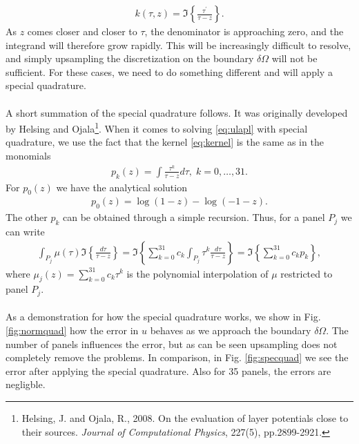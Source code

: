 \documentclass[a4paper,10pt]{article}
\begin{document}
\begin{align}
k(\tau,z) = \Im\left\{ \frac{\tau^\prime}{\tau-z}\right\}.
\label{eq:kernel}
\end{align}
As $z$ comes closer and closer to $\tau$, the denominator is approaching zero, and the integrand will therefore grow rapidly. This will be increasingly difficult to resolve, and simply upsampling the discretization on the boundary $\delta\Omega$ will not be sufficient. For these cases, we need to do something different and will apply a special quadrature.
\\ \\
A short summation of the special quadrature follows. It was originally developed by Helsing and Ojala\footnote{Helsing, J. and Ojala, R., 2008. On the evaluation of layer potentials close to their sources. {\em Journal of Computational Physics}, 227(5), pp.2899-2921.}. When it comes to solving \eqref{eq:ulapl} with special quadrature, we use the fact that the kernel \eqref{eq:kernel} is the same as in the monomials 
\begin{align}
    p_k(z) = \int \frac{\tau^k}{\tau-z}d\tau, \; k=0,\hdots,31.
    \label{eq:pkrec}
\end{align}
For $p_0(z)$ we have the analytical solution 
\begin{align}
    p_0(z) = \log(1-z)-\log(-1-z).
    \label{eq:p0}  
\end{align}
The other $p_k$ can be obtained through a simple recursion. Thus, for a panel $P_j$ we can write
\begin{align}
    \int_{P_j} \mu(\tau) \Im\left\{ \frac{d\tau}{\tau-z} \right\} = \Im\left\{ \sum_{k=0}^{31} c_k \int_{P_j} \tau^k\frac{d\tau}{\tau-z} \right\} = \Im\left\{ \sum_{k=0}^{31} c_kp_k \right\},
    \label{eq:specQ}
\end{align}
where $\mu_j(z) = \sum_{k=0}^{31} c_k\tau^k$ is the polynomial interpolation of $\mu$ restricted to panel $P_j$. 
\\ \\
As a demonstration for how the special quadrature works, we show in Fig. \ref{fig:normquad} how the error in $u$ behaves as we approach the boundary $\delta\Omega$. The number of panels influences the error, but as can be seen upsampling does not completely remove the problems. In comparison, in Fig. \ref{fig:specquad} we see the error after applying the special quadrature. Also for 35 panels, the errors are negligble. 
\end{document}
